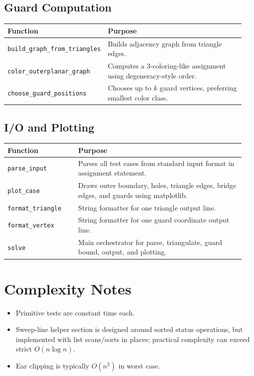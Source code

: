 \documentclass[11pt]{article}
\begin{document}
\subsection{Guard Computation}
\begin{longtable}{p{0.28\linewidth}p{0.66\linewidth}}
\toprule
Function & Purpose \\
\midrule
\texttt{build\_graph\_from\_triangles} & Builds adjacency graph from triangle edges. \\
\texttt{color\_outerplanar\_graph} & Computes a 3-coloring-like assignment using degeneracy-style order. \\
\texttt{choose\_guard\_positions} & Chooses up to $k$ guard vertices, preferring smallest color class. \\
\bottomrule
\end{longtable}

\subsection{I/O and Plotting}
\begin{longtable}{p{0.28\linewidth}p{0.66\linewidth}}
\toprule
Function & Purpose \\
\midrule
\texttt{parse\_input} & Parses all test cases from standard input format in assignment statement. \\
\texttt{plot\_case} & Draws outer boundary, holes, triangle edges, bridge edges, and guards using matplotlib. \\
\texttt{format\_triangle} & String formatter for one triangle output line. \\
\texttt{format\_vertex} & String formatter for one guard coordinate output line. \\
\texttt{solve} & Main orchestrator for parse, triangulate, guard bound, output, and plotting. \\
\bottomrule
\end{longtable}

\section{Complexity Notes}
\begin{itemize}
  \item Primitive tests are constant time each.
  \item Sweep-line helper section is designed around sorted status operations, but implemented with list scans/sorts in places; practical complexity can exceed strict $O(n \log n)$.
  \item Ear clipping is typically $O(n^2)$ in worst case.
\end{itemize}
\end{document}

